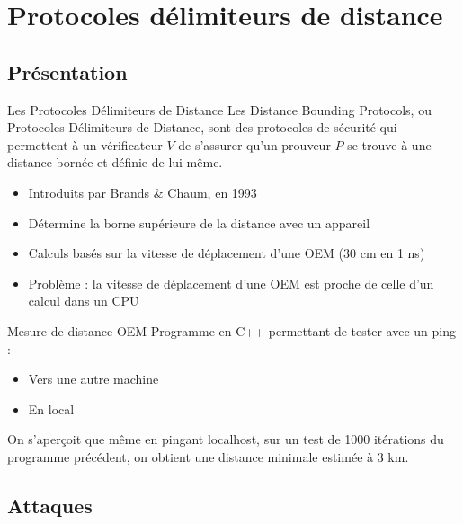 \documentclass[aspectratio=169]{beamer}
\begin{document}
\section{Protocoles délimiteurs de distance}

\subsection{Présentation}

\begin{frame}{Les Protocoles Délimiteurs de Distance}
Les Distance Bounding Protocols, ou Protocoles Délimiteurs de Distance, sont des protocoles de sécurité qui permettent à un vérificateur $V$ de s'assurer qu'un prouveur $P$ se trouve à une distance bornée et définie de lui-même. \cite{wiki:pdd}

\bigskip

\pause
\begin{itemize}
\item Introduits par Brands \& Chaum, en 1993 \cite{DB1}
\item Détermine la borne supérieure de la distance avec un appareil
\item Calculs basés sur la vitesse de déplacement d'une OEM (30 cm en 1 ns)
\pause
\item Problème : la vitesse de déplacement d'une OEM est proche de celle d'un calcul dans un CPU 
\end{itemize}

\end{frame}

\begin{frame}{Mesure de distance OEM}
    Programme en C++ permettant de tester avec un ping :
    \begin{itemize}
        \item Vers une autre machine
        \item En local
    \end{itemize}

    \bigskip
    
    On s'aperçoit que même en pingant localhost, sur un test de \si{1000} itérations du programme précédent, on obtient une distance minimale estimée à 3 km. 
\end{frame}


\subsection{Attaques}
\end{document}
